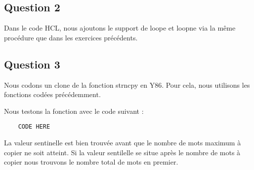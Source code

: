 \documentclass[a4paper,10pt]{article}
\begin{document}
\subsection{Question 2}
Dans le code HCL, nous ajoutons le support de loope et loopne via la même procédure que dans les exercices précédents.

\subsection{Question 3}
Nous codons un clone de la fonction strncpy en Y86.
Pour cela, nous utilisons les fonctions codées précédemment.

Nous testons la fonction avec le code suivant :
\begin{verbatim}
    CODE HERE
\end{verbatim}
La valeur sentinelle est bien trouvée avant que le nombre de mots maximum à copier ne soit atteint. Si la valeur sentilelle se situe après le nombre de mots à copier nous trouvons le nombre total de mots en premier.
\end{document}
